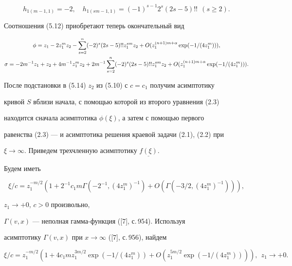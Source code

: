 $$ 


h_{1(m-1,1)}=-2,\quad h_{1(sm-1,1)}=(-1)^{s-1} 


2^s(2s-5)!!\ \ (s\ge2). 


$$ 


Соотношения (5.12) приобретают теперь окончательный вид 


\begin{gather} 


\phi=z_1-2z^m_1z_2-\sum^n_{s=2}(-2)^s(2s-5)!! z^{sm}_1z_2+ 


O(z^{(n+1)m+\alpha}_1\exp(-1/(4z^m_1))),\\ 


\sigma=-2m^{-1}z_1+z_2+4m^{-1}z^m_1z_2+2m^{-1}\sum^n_{s=2} 


(-2)^s(2s-5)!! z^{sm}_1z_2+O(z^{(n+1)m+\alpha}_1 


\exp(-1/(4z^m_1))).\notag 


\end{gather} 


После подстановки в (5.14) $z_2$ из (5.10) с $c=c_1$ получим асимптотику 


кривой $S$ вблизи начала, с помощью которой из второго уравнения (2.3) 


находится сначала асимптотика $\phi(\xi)$, а затем с помощью первого 


равенства (2.3) --- и асимптотика решения краевой задачи (2.1), (2.2) при 


$\xi\to\infty$. Приведем трехчленную асимптотику $\underline{f(\xi)}$. 


Будем иметь


$$


\xi/c=z^{-m/2}_1(1+2^{-1}c_1m\Gamma(-2^{-1},(4z^m_1)^{-1})+ 


O(\Gamma(-3/2,(4z^m_1)^{-1}))),


$$


$z_1\to+0$, $c>0$ произвольно, 


$\Gamma(v,x)$ --- неполная гамма-функция ([7], с.\,954). Используя 


асимптотику $\Gamma(v,x)$ при $x\to\infty$ ([7], с.\,956), найдем 


\begin{equation} 


\xi/c=z^{-m/2}_1(1+4c_1m z^{3m/2}_1\exp(-1/(4z^m_1))+ 


O(z^{5m/2}_1\exp(-1/(4z^m_1)))),\ \ z_1\to+0. 


\end{equation} 


